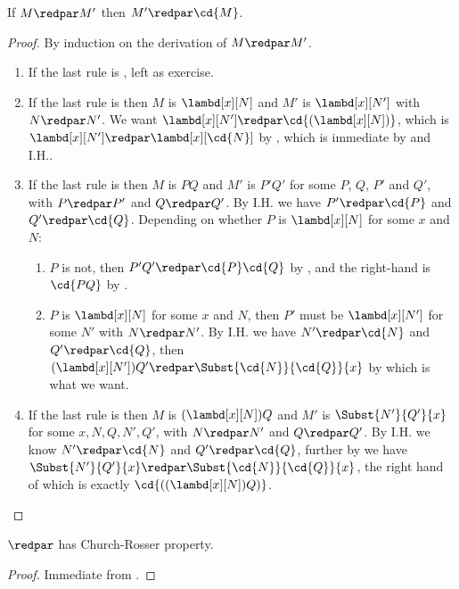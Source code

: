 \documentclass[../../../include/open-logic-section]{subfiles}
\begin{document}
\begin{lem}
  If $M \redpar M'$ then $M' \redpar \cd{M}$.
\end{lem}
\begin{proof}
  By induction on the derivation of $M \redpar M'$.
  \begin{enumerate}
    \item If the last rule is , left as exercise.
    \item If the last rule is  then $M$ is 
      $\lambd[x][N]$ and $M'$ is $\lambd[x][N']$ with
      $N \redpar N'$. We want $\lambd[x][N'] \redpar
      \cd{(\lambd[x][N])}$, which is $\lambd[x][N'] \redpar
      \lambd[x][\cd{N}]$ by , which is immediate by
       and I.H.. 
    \item If the last rule is  then $M$ is 
      $PQ$ and $M'$ is $P'Q'$ for some $P$, $Q$, $P'$ and $Q'$, with $P \redpar P'$
      and $Q \redpar Q'$. By I.H. we have $P' \redpar \cd{P}$ and
      $Q' \redpar \cd{Q}$.  Depending on whether $P$ is 
      $\lambd[x][N]$ for some $x$ and $N$:
      \begin{enumerate}
        \item $P$ is not, then $P'Q' \redpar \cd{P}\cd{Q}$ by
          , and the right-hand is $\cd{PQ}$ by .
        \item $P$ is $\lambd[x][N]$ for some $x$ and $N$, then
          $P'$ must be $\lambd[x][N']$ for some $N'$ with 
          $N \redpar N'$. By I.H. we have $N' \redpar \cd{N}$ and
          $Q' \redpar \cd{Q}$, then $(\lambd[x][N'])Q' \redpar
          \Subst{\cd{N}}{\cd{Q}}{x}$ by  which is what
          we want.
      \end{enumerate}
    \item If the last rule is  then $M$ is 
      $(\lambd[x][N])Q$  and $M'$ is $\Subst{N'}{Q'}{x}$
      for some $x, N, Q, N', Q'$, with $N \redpar N'$ and $Q
      \redpar Q'$. By I.H. we know $N' \redpar \cd{N}$ and $Q'
      \redpar \cd{Q}$, further by  we have
      $\Subst{N'}{Q'}{x} \redpar \Subst{\cd{N}}{\cd{Q}}{x}$, the
      right hand of which is exactly $\cd{((\lambd[x][N])Q)}$.
  \end{enumerate}
\end{proof}

\begin{thm}
  $\redpar$ has Church-Rosser property.
\end{thm}
\begin{proof}
  Immediate from .
\end{proof}
\end{document}
